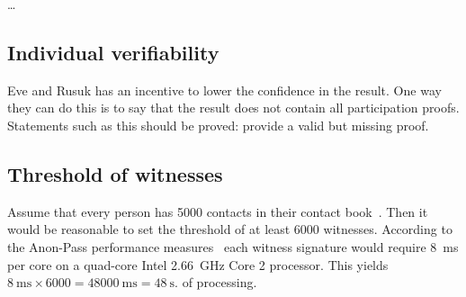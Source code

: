 \dots

\subsection{Individual verifiability}

Eve and Rusuk has an incentive to lower the confidence in the result.
One way they can do this is to say that the result does not contain all 
participation proofs.
Statements such as this should be proved: provide a valid but missing proof.

\subsection{Threshold of witnesses}

Assume that every person has 5000 contacts in their contact 
book~\cite{DifficultyOfPrivateContactDiscovery}.
Then it would be reasonable to set the threshold of at least 6000 witnesses.
According to the Anon-Pass performance measures~\cite{AnonPass} each witness 
signature would require \SI{8}{\milli\second} per core on a quad-core Intel 
\SI{2.66}{\giga\hertz} Core 2 processor.
This yields \(
  \SI{8}{\milli\second}\times 6000 = \SI{48000}{\milli\second} = 
  \SI{48}{\second}.
\) of processing.
